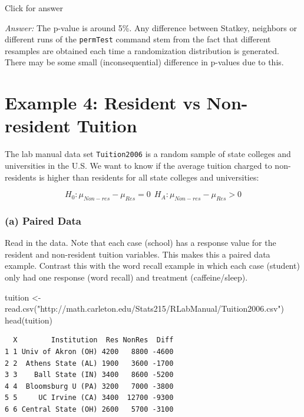 \documentclass[
]{book}
\newenvironment{Shaded}{\begin{snugshade}}{\end{snugshade}}
\newcommand{\FunctionTok}[1]{\textcolor[rgb]{0.00,0.00,0.00}{#1}}
\newcommand{\NormalTok}[1]{#1}
\newcommand{\OtherTok}[1]{\textcolor[rgb]{0.56,0.35,0.01}{#1}}
\newcommand{\StringTok}[1]{\textcolor[rgb]{0.31,0.60,0.02}{#1}}
\begin{document}
Click for answer

\emph{Answer:} The p-value is around 5\%. Any difference between Statkey, neighbors or different runs of the \texttt{permTest} command stem from the fact that different resamples are obtained each time a randomization distribution is generated. There may be some small (inconsequential) difference in p-values due to this.

\hypertarget{example-4-resident-vs-non-resident-tuition}{%
\section{Example 4: Resident vs Non-resident Tuition}\label{example-4-resident-vs-non-resident-tuition}}

The lab manual data set \texttt{Tuition2006} is a random sample of state colleges and universities in the U.S. We want to know if the average tuition charged to non-residents is higher than residents for all state colleges and universities:

\[
H_0: \mu_{Non-res} - \mu_{Res} = 0 \ \ H_A: \mu_{Non-res} - \mu_{Res} > 0
\]

\hypertarget{a-paired-data}{%
\subsubsection{(a) Paired Data}\label{a-paired-data}}

Read in the data. Note that each case (school) has a response value for the resident and non-resident tuition variables. This makes this a paired data example. Contrast this with the word recall example in which each case (student) only had one response (word recall) and treatment (caffeine/sleep).

\begin{Shaded}
\begin{Highlighting}[]
\NormalTok{tuition }\OtherTok{\textless{}{-}} \FunctionTok{read.csv}\NormalTok{(}\StringTok{"http://math.carleton.edu/Stats215/RLabManual/Tuition2006.csv"}\NormalTok{)}
\FunctionTok{head}\NormalTok{(tuition)}
\end{Highlighting}
\end{Shaded}

\begin{verbatim}
  X        Institution  Res NonRes  Diff
1 1 Univ of Akron (OH) 4200   8800 -4600
2 2  Athens State (AL) 1900   3600 -1700
3 3    Ball State (IN) 3400   8600 -5200
4 4  Bloomsburg U (PA) 3200   7000 -3800
5 5     UC Irvine (CA) 3400  12700 -9300
6 6 Central State (OH) 2600   5700 -3100
\end{verbatim}
\end{document}
